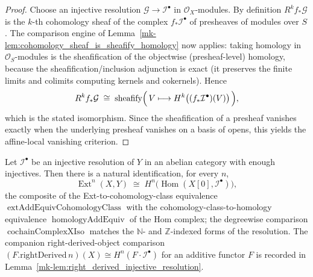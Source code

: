 \begin{proof}
  Choose an injective resolution \(\mathcal{G} \to \mathcal{I}^\bullet\) in
  \(\mathcal{O}_X\)-modules. By definition \(R^k f_*\mathcal{G}\) is the \(k\)-th
  cohomology sheaf of the complex \(f_*\mathcal{I}^\bullet\) of presheaves of modules
  over \(S\). The comparison engine of
  Lemma~\ref{mk-lem:cohomology_sheaf_is_sheafify_homology} now applies: taking homology in
  \(\mathcal{O}_S\)-modules is the sheafification of the objectwise (presheaf-level)
  homology, because the sheafification/inclusion adjunction is exact (it preserves the
  finite limits and colimits computing kernels and cokernels). Hence
  \[
    R^k f_*\mathcal{G}
      \;\cong\;
    \operatorname{sheafify}\Bigl(\,V \longmapsto
      H^k\bigl((f_*\mathcal{I}^\bullet)(V)\bigr)\,\Bigr),
  \]
  which is the stated isomorphism. Since the sheafification of a presheaf vanishes
  exactly when the underlying presheaf vanishes on a basis of opens, this yields the
  affine-local vanishing criterion.
\end{proof}

\begin{lemma}
  \label{mk-lem:ext_homcomplex_mathlib}
  \mathlibok

  Let \(\mathcal{I}^\bullet\) be an injective resolution of \(Y\) in an abelian category with
  enough injectives. Then there is a natural identification, for every \(n\),
  \[
    \operatorname{Ext}^n(X, Y)
      \;\cong\;
    H^n\bigl(\operatorname{Hom}(X[0], \mathcal{I}^\bullet)\bigr),
  \]
  the composite of the Ext-to-cohomology-class equivalence
  \(\operatorname{extAddEquivCohomologyClass}\) with the cohomology-class-to-homology equivalence
  \(\operatorname{homologyAddEquiv}\) of the Hom complex; the degreewise comparison
  \(\operatorname{cochainComplexXIso}\) matches the \(\mathbb{N}\)- and \(\mathbb{Z}\)-indexed forms of
  the resolution. The companion right-derived-object comparison
  \((F.\mathrm{rightDerived}\,n)(X) \cong H^n(F \cdot \mathcal{I}^\bullet)\) for an additive functor
  \(F\) is recorded in Lemma~\ref{mk-lem:right_derived_injective_resolution}.
\end{lemma}

